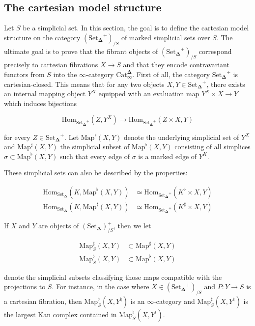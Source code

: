 \documentclass[12pt]{amsart}
\newcommand{\8}{\ensuremath{\infty}}
\newcommand{\SSet}{\ensuremath{\text{Set}_{\boldsymbol{\Delta}}}}
\newcommand{\Catinfdel}{\ensuremath{\text{Cat}^{\boldsymbol{\Delta}}_{\infty}}}
\newcommand{\Map}{\ensuremath{\text{Map}}}
\newcommand{\Hom}{\ensuremath{\text{Hom}}}
\begin{document}
\subsection{The cartesian model structure}
Let $S$ be a simplicial set. In this section, the goal is to define the cartesian model structure on the category $(\SSet^+)_{/S}$ of marked simplicial sets over $S$. The ultimate goal is to prove that the fibrant objects of $(\SSet^+)_{/S}$ correspond precisely to cartesian fibrations $X \rightarrow S$ and that they encode contravariant functors from $S$ into the \8-category \Catinfdel.
First of all, the category $\SSet^+$ is cartesian-closed. This means that for any two objects $X, Y\in \SSet^+$, there exists an internal mapping object $Y^X$ equipped with an evaluation map $Y^X\times X \rightarrow Y$ which induces bijections

$$
  \Hom_{\SSet^+}(Z, Y^X) \rightarrow \Hom_{\SSet^+}(Z\times X, Y)
$$

for every $Z \in \SSet^+$. Let $\Map^\flat(X, Y)$ denote the underlying simplicial set of $Y^X$ and $\Map^\sharp(X, Y)$ the simplicial subset of $\Map^\flat(X, Y)$ consisting of all simplices $\sigma\subset \Map^\flat(X, Y)$ such that every edge of $\sigma$ is a marked edge of $Y^X$.

These simplicial sets can also be described by the properties:

\begin{align*}
  \Hom_{\SSet}(K, \Map^\flat(X, Y))  & \simeq \Hom_{\SSet^+}(K^\flat\times X, Y)  \\
  \Hom_{\SSet}(K, \Map^\sharp(X, Y)) & \simeq \Hom_{\SSet^+}(K^\sharp\times X, Y)
\end{align*}

If $X$ and $Y$ are objects of $(\SSet)^+_{/S}$, then we let

\begin{align*}
  \Map_S^\sharp(X, Y) & \subset \Map^\sharp(X, Y) \\
  \Map_S^\flat(X, Y)  & \subset \Map^\flat(X, Y)
\end{align*}

denote the simplicial subsets classifying those maps compatible with the projections to $S$. For instance, in the case where $X \in (\SSet^+)_{/S}$ and $P: Y \rightarrow S$ is a cartesian fibration, then $\Map^\flat_S(X, Y^\natural)$ is an \8-category and $\Map^\sharp_S(X, Y^\natural)$ is the largest Kan complex contained in $\Map^\flat_S(X, Y^\natural)$.
\end{document}
